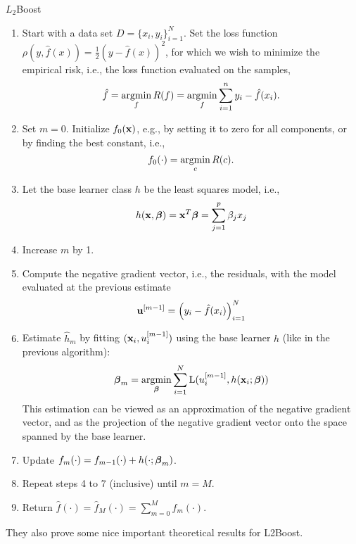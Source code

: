 \begin{algorithm}
\caption{$L_2$Boost}
\label{algo:L2}
\begin{enumerate}
    \item Start with a data set $D=\{x_i, y_i\}_{i=1}^N$. Set the loss function $\rho(y,\hat{f}(x))=\frac{1}{2}(y-\hat{f}(x))^2$, for which we wish to
        minimize the empirical risk, i.e., the loss function evaluated on the samples,
        \begin{equation}
            \hat{f}=\operatorname*{argmin}_{f}R(f)=\operatorname*{argmin}_{f}\sum_{i=1}^n y_i-\hat{f}(x_i).
        \end{equation}
    \item Set $m=0$. Initialize $f_0(\mathbf{x})$, e.g., by setting it to zero for all components, or by finding the best constant, i.e.,
        \begin{equation}
            f_0(\cdot)=\operatorname*{argmin}_c R(c).
        \end{equation}
    \item Let the base learner class $h$ be the least squares model, i.e.,
        \begin{equation}
            h(\mathbf{x}, \boldsymbol{\beta})=\mathbf{x}^T\boldsymbol{\beta}=\sum_{j=1}^p\beta_jx_j
        \end{equation}
    \item Increase $m$ by 1.
    \item Compute the negative gradient vector, i.e., the residuals, with the model evaluated at the previous estimate
        \begin{equation}
            \mathbf{u}^{[m-1]}=\left(y_i-\hat{f}(x_i)\right)_{i=1}^N
        \end{equation}
    \item Estimate $\hat{h}_m$ by fitting $(\mathbf{x}_i,u_i^{[m-1]})$ using the base learner $h$ (like in the previous algorithm):
        \begin{equation*}
            \boldsymbol{\beta}_m=\operatorname*{argmin}_{\boldsymbol{\beta}}\sum_{i=1}^N\operatorname{L}(u_i^{[m-1]},h(\mathbf{x}_i;\boldsymbol{\beta}))
        \end{equation*}
        This estimation can be viewed as an approximation of the negative gradient vector, and as the projection of the negative gradient vector onto the space spanned by the base learner.
    \item Update $f_m(\cdot)=f_{m-1}(\cdot)+h(\cdot;\boldsymbol{\beta}_m)$.
    \item Repeat steps 4 to 7 (inclusive) until $m=M$.
    \item Return $\hat{f}(\cdot)=\hat{f}_M(\cdot)=\sum_{m=0}^Mf_m(\cdot)$.
\end{enumerate}
\end{algorithm}
They also prove some nice important theoretical results for L2Boost.
